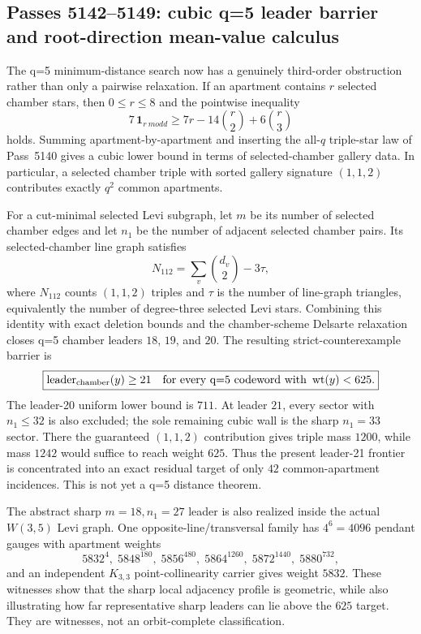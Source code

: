 \ifdefined\WPassFiveOneFourTwoLoaded\else
\gdef\WPassFiveOneFourTwoLoaded{1}
\subsection*{Passes 5142--5149: cubic q=5 leader barrier and root-direction mean-value calculus}

The q=5 minimum-distance search now has a genuinely third-order obstruction rather than only a pairwise relaxation.  If an apartment contains $r$ selected chamber stars, then $0\le r\le8$ and the pointwise inequality
\[
  7\,\mathbf 1_{r\ {
m odd}}
  \ge 7r-14\binom r2+6\binom r3
\]
holds.  Summing apartment-by-apartment and inserting the all-$q$ triple-star law of Pass~5140 gives a cubic lower bound in terms of selected-chamber gallery data.  In particular, a selected chamber triple with sorted gallery signature $(1,1,2)$ contributes exactly $q^2$ common apartments.

For a cut-minimal selected Levi subgraph, let $m$ be its number of selected chamber edges and let $n_1$ be the number of adjacent selected chamber pairs.  Its selected-chamber line graph satisfies
\[
 N_{112}=\sum_v\binom{d_v}{2}-3\tau,
\]
where $N_{112}$ counts $(1,1,2)$ triples and $\tau$ is the number of line-graph triangles, equivalently the number of degree-three selected Levi stars.  Combining this identity with exact deletion bounds and the chamber-scheme Delsarte relaxation closes q=5 chamber leaders $18$, $19$, and $20$.  The resulting strict-counterexample barrier is
\[
 \boxed{\operatorname{leader}_{\rm chamber}(y)\ge21\quad
        \text{for every q=5 codeword with }\operatorname{wt}(y)<625.}
\]
The leader-20 uniform lower bound is $711$.  At leader $21$, every sector with $n_1\le32$ is also excluded; the sole remaining cubic wall is the sharp $n_1=33$ sector.  There the guaranteed $(1,1,2)$ contribution gives triple mass $1200$, while mass $1242$ would suffice to reach weight $625$.  Thus the present leader-21 frontier is concentrated into an exact residual target of only $42$ common-apartment incidences.  This is not yet a q=5 distance theorem.

The abstract sharp $m=18,n_1=27$ leader is also realized inside the actual $W(3,5)$ Levi graph.  One opposite-line/transversal family has $4^6=4096$ pendant gauges with apartment weights
\[
 5832^{4},\;5848^{180},\;5856^{480},\;5864^{1260},\;5872^{1440},\;5880^{732},
\]
and an independent $K_{3,3}$ point-collinearity carrier gives weight $5832$.  These witnesses show that the sharp local adjacency profile is geometric, while also illustrating how far representative sharp leaders can lie above the $625$ target.  They are witnesses, not an orbit-complete classification.

